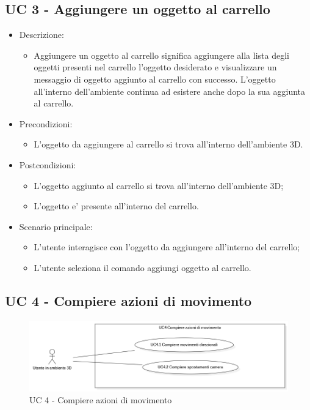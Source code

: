 \subsection{UC 3 - Aggiungere un oggetto al carrello}
\begin{itemize}

	\item Descrizione:
	\begin{itemize}
		\item Aggiungere un oggetto al carrello significa aggiungere alla lista degli oggetti presenti nel carrello l'oggetto desiderato e visualizzare un messaggio di oggetto aggiunto al carrello con successo.
\newline L'oggetto all'interno dell'ambiente continua ad esistere anche dopo la sua aggiunta al carrello.
	\end{itemize}
	
	\item Precondizioni:
	\begin{itemize}
		\item L'oggetto da aggiungere al carrello si trova all'interno dell'ambiente 3D.
	\end{itemize}
	
	\item Postcondizioni:
	\begin{itemize}
		\item L'oggetto aggiunto al carrello si trova all'interno dell'ambiente 3D;
		\item L'oggetto e' presente all'interno del carrello.
	\end{itemize}
	
	\item Scenario principale:
	\begin{itemize}
		\item L'utente interagisce con l'oggetto da aggiungere all'interno del carrello;
		\item L'utente seleziona il comando aggiungi oggetto al carrello.
	\end{itemize}
	
\end{itemize}

\subsection{UC 4 - Compiere azioni di movimento}

\begin{figure}[H]
  \renewcommand{\thefigure}{5}
  \includegraphics[width=\linewidth]{./res/images/UC4.png}
  \caption{UC 4 - Compiere azioni di movimento}
  \label{fig:UC 4}
\end{figure}

